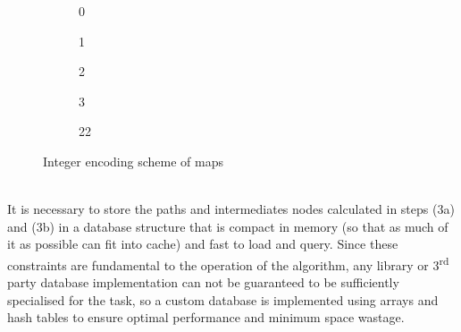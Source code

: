 \documentclass[12pt,notitlepage]{report}
\begin{document}
\begin{figure}
    \centering
    \begin{subfigure}{.18\textwidth}
    \centering
    \caption{0}
    \end{subfigure}
    \begin{subfigure}{.18\textwidth}
    \centering
    \caption{1}
    \end{subfigure}
     \begin{subfigure}{.18\textwidth}
     \centering
    \caption{2}
    \end{subfigure}
    \begin{subfigure}{.18\textwidth}
    \centering
    \caption{3}
    \end{subfigure}
    \begin{subfigure}{.18\textwidth}
    \centering
    \caption{22}
    \end{subfigure}
  \caption{Integer encoding scheme of maps}
\end{figure}

\\
\noindent
It is necessary to store the paths and intermediates nodes calculated in steps (3a) and (3b) in a database structure that is compact in memory (so that as much of it as possible can fit into cache) and fast to load and query. Since these constraints are fundamental to the operation of the algorithm, any library or 3\textsuperscript{rd} party database implementation can not be guaranteed to be sufficiently specialised for the task, so a custom database is implemented using arrays and hash tables to ensure optimal performance and minimum space wastage.\\
\end{document}
